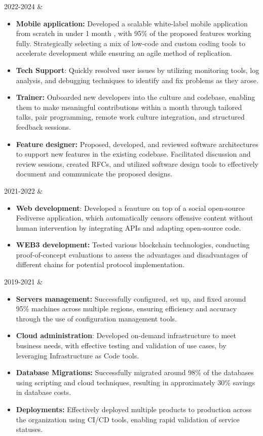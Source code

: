 \documentclass[
    changecolor={111, 156, 45}, 
]{cv-roald}
\begin{document}
2022-2024 & 
\begin{itemize}
\item \textbf{Mobile application:} Developed a scalable white-label mobile application from scratch in under 1 month , with 95\% of the proposed features working fully. Strategically selecting a mix of low-code and custom coding tools to accelerate development while ensuring an agile method of replication.
\item \textbf{Tech Support}: Quickly resolved user issues by utilizing monitoring tools, log analysis, and debugging techniques to identify and fix problems as they arose.
\item \textbf{Trainer:} Onboarded new developers into the culture and codebase, enabling them to make meaningful contributions within a month through tailored talks, pair programming, remote work culture integration, and structured feedback sessions.
\item \textbf{Feature designer:} Proposed, developed, and reviewed software architectures to support new features in the existing codebase. Facilitated discussion and review sessions, created RFCs, and utilized software design tools to effectively document and communicate the proposed designs.
\end{itemize}

2021-2022 & 
\begin{itemize}
    \item \textbf{Web development}: Developed a feauture on top of a social open-source Fediverse application, which automatically censors offensive content without human intervention by integrating APIs and adapting open-source code.
    \item \textbf{WEB3 development:} Tested various blockchain technologies, conducting proof-of-concept evaluations to assess the advantages and disadvantages of different chains for potential protocol implementation.
\end{itemize}

2019-2021 &  
    \begin{itemize}
        \item \textbf{Servers management:} Successfully configured, set up, and fixed around 95\% machines across multiple regions, ensuring efficiency and accuracy through the use of configuration management tools.
            \item \textbf{Cloud administration}: Developed on-demand infrastructure to meet business needs, with effective testing and validation of use cases, by leveraging Infrastructure as Code tools.
            \item \textbf{Database Migrations:} Successfully migrated around 98\% of the databases using scripting and cloud techniques, resulting in approximately 30\% savings in database costs.
            \item \textbf{Deployments:} Effectively deployed multiple products to production across the organization using CI/CD tools, enabling rapid validation of service statuses.
        \end{itemize}
\end{document}
